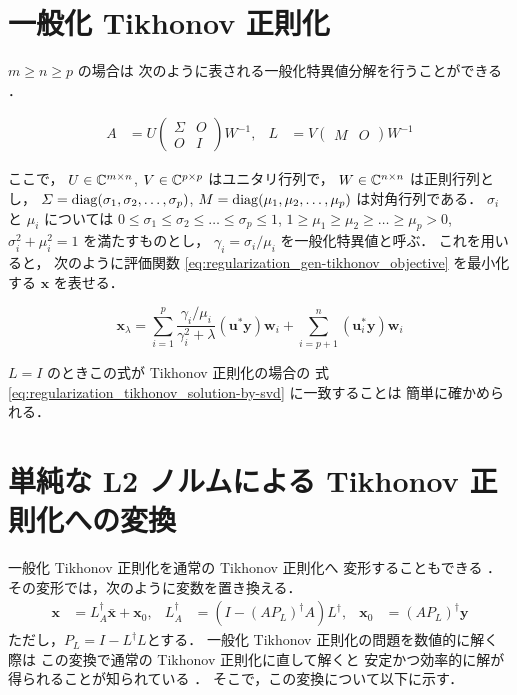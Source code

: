 \section{一般化 Tikhonov 正則化}

$m \ge n \ge p$ の場合は
次のように表される一般化特異値分解を行うことができる \cite{Hansen1998}．

\begin{align}
    A       & =U
    \begin{pmatrix}
        \Sigma & O \\
        O      & I
    \end{pmatrix}
    W^{-1}, &
    L       & =V
    \begin{pmatrix}
        M & O
    \end{pmatrix}
    W^{-1}
\end{align}

ここで，
$U \in \mathbb{C}^{m \times n}$,
$V \in \mathbb{C}^{p \times p}$
はユニタリ行列で，
$W \in \mathbb{C}^{n \times n}$
は正則行列とし，
$\varSigma = \operatorname{diag}(\sigma_1, \sigma_2, \ldots, \sigma_p)$,
$M = \operatorname{diag}(\mu_1, \mu_2, \ldots, \mu_p)$
は対角行列である．
$\sigma_i$ と $\mu_i$ については
$0 \le \sigma_1 \le \sigma_2 \le \ldots \le \sigma_p \le 1$,
$1 \ge \mu_1 \ge \mu_2 \ge \ldots \ge \mu_p > 0$,
$\sigma_i^2 + \mu_i^2 = 1$
を満たすものとし，
$\gamma_i = \sigma_i / \mu_i$
を一般化特異値と呼ぶ．
これを用いると，
次のように評価関数 \eqref{eq:regularization_gen-tikhonov_objective} を最小化する
$\bm{x}$ を表せる\cite{Hansen1998}．

\begin{equation}
    \bm{x}_\lambda =
    \sum_{i=1}^{p} \frac{\gamma_i / \mu_i}{\gamma_i^2+\lambda}
    (\bm{u}^*\bm{y}) \bm{w}_i
    +\sum_{i=p+1}^n (\bm{u}_i^*\bm{y}) \bm{w}_i
\end{equation}

$L=I$ のときこの式が Tikhonov 正則化の場合の
式 \eqref{eq:regularization_tikhonov_solution-by-svd} に一致することは
簡単に確かめられる．

\section{単純な L2 ノルムによる Tikhonov 正則化への変換}

一般化 Tikhonov 正則化を通常の Tikhonov 正則化へ
変形することもできる \cite{Hansen1998}．
その変形では，次のように変数を置き換える．
\begin{align}
    \bm{x}      & = L_A^\dagger \bar{\bm{x}} + \bm{x}_0,                     &
    L_A^\dagger & = \left(I - \left(A P_L\right)^\dagger A\right) L^\dagger, &
    \bm{x}_0    & = \left(A P_L\right)^\dagger \bm{y}
    \label{eq:regularization_gen-tikhonov_change-of-variables}
\end{align}
ただし，$P_L = I - L^\dagger L$とする．
一般化 Tikhonov 正則化の問題を数値的に解く際は
この変換で通常の Tikhonov 正則化に直して解くと
安定かつ効率的に解が得られることが知られている \cite{Hansen1998}．
そこで，この変換について以下に示す．

